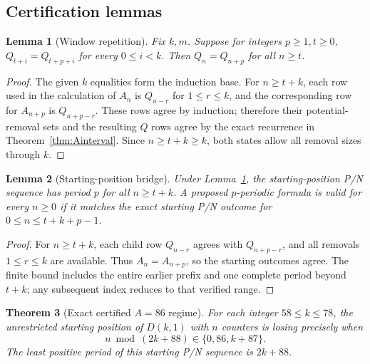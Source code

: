 \documentclass[11pt]{article}
\newtheorem{theorem}{Theorem}[section]
\newtheorem{lemma}[theorem]{Lemma}
\theoremstyle{remark}
\begin{document}
\subsection{Certification lemmas}
\begin{lemma}[Window repetition]\label{lem:Bwindow}
Fix $k,m$. Suppose for integers $p\ge1,t\ge0$,
$Q_{t+i}=Q_{t+p+i}$ for every $0\le i<k$. Then $Q_n=Q_{n+p}$ for all $n\ge t$.
\end{lemma}
\begin{proof}
The given $k$ equalities form the induction base. For $n\ge t+k$, each row used in the calculation of $A_n$ is $Q_{n-r}$ for $1\le r\le k$, and the corresponding row for $A_{n+p}$ is $Q_{n+p-r}$. These rows agree by induction; therefore their potential-removal sets and the resulting $Q$ rows agree by the exact recurrence in Theorem~\ref{thm:Ainterval}. Since $n\ge t+k\ge k$, both states allow all removal sizes through $k$.
\end{proof}
\begin{lemma}[Starting-position bridge]\label{lem:Bbridge}
Under Lemma~\ref{lem:Bwindow}, the starting-position P/N sequence has period $p$ for all $n\ge t+k$. A proposed $p$-periodic formula is valid for every $n\ge0$ if it matches the exact starting P/N outcome for $0\le n\le t+k+p-1$.
\end{lemma}
\begin{proof}For $n\ge t+k$, each child row $Q_{n-r}$ agrees with $Q_{n+p-r}$, and all removals $1\le r\le k$ are available. Thus $A_n=A_{n+p}$, so the starting outcomes agree. The finite bound includes the entire earlier prefix and one complete period beyond $t+k$; any subsequent index reduces to that verified range.\end{proof}
\begin{theorem}[Exact certified $A=86$ regime]\label{thm:B}
For each integer $58\le k\le78$, the unrestricted starting position of $D(k,1)$ with $n$ counters is losing precisely when
\[\boxed{n\bmod(2k+88)\in\{0,86,k+87\}.}\]
The least positive period of this starting P/N sequence is $2k+88$.
\end{theorem}
\end{document}
